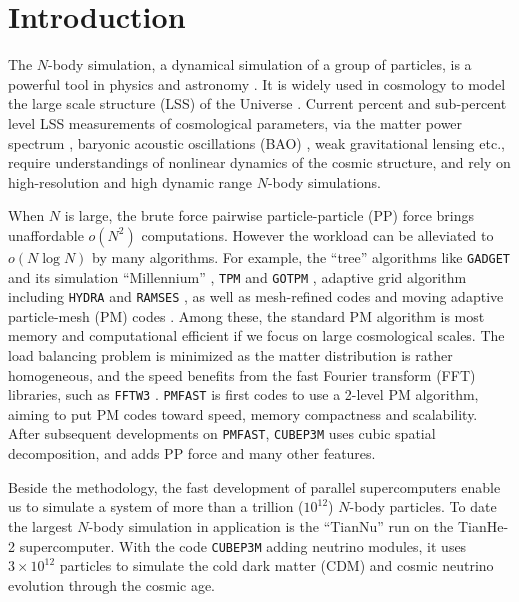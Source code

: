 \documentclass[10pt,twocolumn,preprint]{emulateapj}
\begin{document}
\section{Introduction}\label{s.intro}
The $N$-body simulation, a dynamical simulation of a group of particles, is a powerful tool in physics and astronomy \citep{1988csup.book.....H}. It is widely used in cosmology to model the large scale structure (LSS) of the Universe \citep{1985ApJ...292..371D}. Current percent and sub-percent level LSS measurements of cosmological parameters, via the matter power spectrum \citep{2005MNRAS.360L..82R,2011ApJ...726....7T}, baryonic acoustic oscillations (BAO) \citep{2005ApJ...633..560E,2009ApJ...700..479T}, weak gravitational lensing \citep{2003ApJ...592..699V,2009A&A...499...31H,2009ApJ...701..945S} etc., require understandings of nonlinear dynamics of the cosmic structure, and rely on high-resolution and high dynamic range $N$-body simulations.

When $N$ is large, the brute force pairwise particle-particle (PP) force brings unaffordable $o(N^2)$ computations. However the workload can be alleviated to $o(N\log N)$ by many algorithms. For example, the ``tree'' algorithms like {\tt GADGET} \citep{2001NewA....6...79S,2005MNRAS.364.1105S} and its simulation ``Millennium'' \citep{2005Natur.435..629S,2012MNRAS.426.2046A}, {\tt TPM} \citep{1995ApJS...98..355X} and {\tt GOTPM} \citep{2004NewA....9..111D}, adaptive grid algorithm including {\tt HYDRA} \citep{1995ApJ...452..797C} and {\tt RAMSES} \citep{2010ascl.soft11007T}, as well as mesh-refined codes \citep{1991ApJ...368L..23C} and moving adaptive particle-mesh (PM) codes \citep{1995ApJS..100..269P}. Among these, the standard PM algorithm \citep{1988csup.book.....H} is most memory and computational efficient if we focus on large cosmological scales. The load balancing problem is minimized as the matter distribution is rather homogeneous, and the speed benefits from the fast Fourier transform (FFT) libraries, such as {\tt FFTW3} \citep{Frigo05thedesign}. {\tt PMFAST} \citep{2005NewA...10..393M} is first codes to use a 2-level PM algorithm, aiming to put PM codes toward speed, memory compactness and scalability. After subsequent developments on {\tt PMFAST}, {\tt CUBEP3M} \citep{2013MNRAS.436..540H} uses cubic spatial decomposition, and adds PP force and many other features.

Beside the methodology, the fast development of parallel supercomputers enable us to simulate a system of more than a trillion ($10^{12}$) $N$-body particles. To date the largest $N$-body simulation in application is the ``TianNu'' \citep{2017NatAs...1E.143Y,2017RAA....17...85E} run on the TianHe-2 supercomputer. With the code {\tt CUBEP3M} adding neutrino modules, it uses $3\times 10^{12}$ particles to simulate the cold dark matter (CDM) and cosmic neutrino evolution through the cosmic age.
\end{document}

